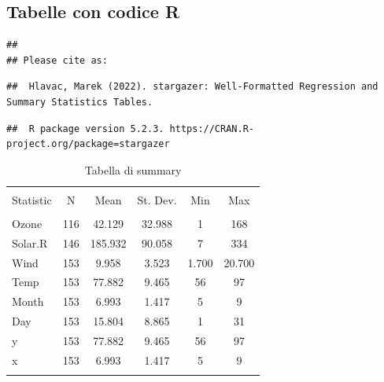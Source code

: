\documentclass[
]{article}
\begin{document}
\hypertarget{tabelle-con-codice-r}{%
\subsection{Tabelle con codice R}\label{tabelle-con-codice-r}}

\begin{verbatim}
## 
## Please cite as:
\end{verbatim}

\begin{verbatim}
##  Hlavac, Marek (2022). stargazer: Well-Formatted Regression and Summary Statistics Tables.
\end{verbatim}

\begin{verbatim}
##  R package version 5.2.3. https://CRAN.R-project.org/package=stargazer
\end{verbatim}

\begin{table}[!htbp] \centering 
  \caption{Tabella di summary} 
  \label{} 
\begin{tabular}{@{\extracolsep{5pt}}lccccc} 
\\[-1.8ex]\hline 
\hline \\[-1.8ex] 
Statistic & \multicolumn{1}{c}{N} & \multicolumn{1}{c}{Mean} & \multicolumn{1}{c}{St. Dev.} & \multicolumn{1}{c}{Min} & \multicolumn{1}{c}{Max} \\ 
\hline \\[-1.8ex] 
Ozone & 116 & 42.129 & 32.988 & 1 & 168 \\ 
Solar.R & 146 & 185.932 & 90.058 & 7 & 334 \\ 
Wind & 153 & 9.958 & 3.523 & 1.700 & 20.700 \\ 
Temp & 153 & 77.882 & 9.465 & 56 & 97 \\ 
Month & 153 & 6.993 & 1.417 & 5 & 9 \\ 
Day & 153 & 15.804 & 8.865 & 1 & 31 \\ 
y & 153 & 77.882 & 9.465 & 56 & 97 \\ 
x & 153 & 6.993 & 1.417 & 5 & 9 \\ 
\hline \\[-1.8ex] 
\end{tabular} 
\end{table}
\end{document}
